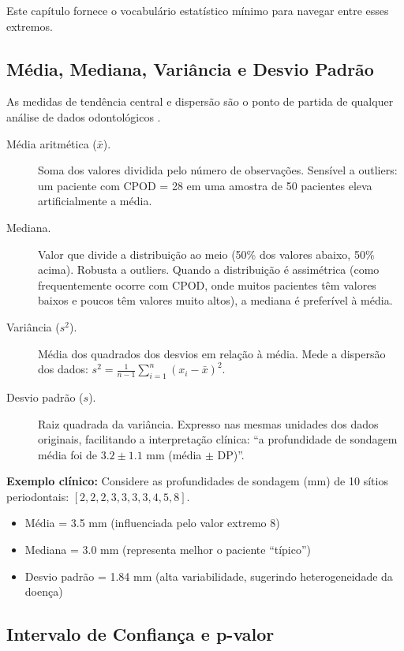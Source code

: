Este capítulo fornece o vocabulário estatístico mínimo para navegar entre esses extremos.

\subsection{Média, Mediana, Variância e Desvio Padrão}

As medidas de tendência central e dispersão são o ponto de partida de qualquer análise de dados odontológicos .

\begin{description}
    \item[Média aritmética ($\bar{x}$).] Soma dos valores dividida pelo número de observações. Sensível a outliers: um paciente com CPOD = 28 em uma amostra de 50 pacientes eleva artificialmente a média.
    
    \item[Mediana.] Valor que divide a distribuição ao meio (50\% dos valores abaixo, 50\% acima). Robusta a outliers. Quando a distribuição é assimétrica (como frequentemente ocorre com CPOD, onde muitos pacientes têm valores baixos e poucos têm valores muito altos), a mediana é preferível à média.
    
    \item[Variância ($s^2$).] Média dos quadrados dos desvios em relação à média. Mede a dispersão dos dados: $s^2 = \frac{1}{n-1}\sum_{i=1}^{n}(x_i - \bar{x})^2$.
    
    \item[Desvio padrão ($s$).] Raiz quadrada da variância. Expresso nas mesmas unidades dos dados originais, facilitando a interpretação clínica: ``a profundidade de sondagem média foi de $3.2 \pm 1.1$ mm (média $\pm$ DP)''.
\end{description}

\textbf{Exemplo clínico:} Considere as profundidades de sondagem (mm) de 10 sítios periodontais: $[2, 2, 2, 3, 3, 3, 3, 4, 5, 8]$.
\begin{itemize}
    \item Média = 3.5 mm (influenciada pelo valor extremo 8)
    \item Mediana = 3.0 mm (representa melhor o paciente ``típico'')
    \item Desvio padrão = 1.84 mm (alta variabilidade, sugerindo heterogeneidade da doença)
\end{itemize}

\subsection{Intervalo de Confiança e p-valor}

